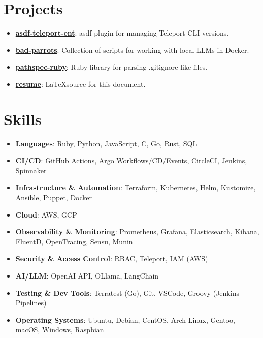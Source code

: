 \documentclass[letterpaper,11pt]{article}
\newcommand{\resumeItem}[2]{
\item[\textgreater]\small{
    \textbf{#1}{: #2 \vspace{-2pt}}
  }
}
\newcommand{\resumeSubItem}[2]{\resumeItem{#1}{#2}\vspace{-4pt}}
\newcommand{\resumeSubHeadingListStart}{\begin{itemize}[leftmargin=*]}
\newcommand{\resumeSubHeadingListEnd}{\end{itemize}}
\begin{document}
\section{Projects}
  \resumeSubHeadingListStart
    \resumeSubItem{\href{https://github.com/highb/asdf-teleport-ent}{asdf-teleport-ent}}
      {asdf plugin for managing Teleport CLI versions.}
    \resumeSubItem{\href{https://github.com/highb/bad-parrots}{bad-parrots}}
      {Collection of scripts for working with local LLMs in Docker.}
    \resumeSubItem{\href{https://github.com/highb/pathspec-ruby}{pathspec-ruby}}
      {Ruby library for parsing .gitignore-like files.}
    \resumeSubItem{\href{https://github.com/highb/resume}{resume}}
      {\LaTeX source for this document.}
  \resumeSubHeadingListEnd

\section{Skills}
  \resumeSubHeadingListStart
    \item{
      \textbf{Languages}{: Ruby, Python, JavaScript, C, Go, Rust, SQL}
    }
    \item{
      \textbf{CI/CD}{: GitHub Actions, Argo Workflows/CD/Events, CircleCI, Jenkins, Spinnaker}
    }
    \item{
      \textbf{Infrastructure \& Automation}{: Terraform, Kubernetes, Helm, Kustomize, Ansible, Puppet, Docker}
    }
    \item{
      \textbf{Cloud}{: AWS, GCP}
    }
    \item{
      \textbf{Observability \& Monitoring}{: Prometheus, Grafana, Elasticsearch, Kibana, FluentD, OpenTracing, Sensu, Munin}
    }
    \item{
      \textbf{Security \& Access Control}{: RBAC, Teleport, IAM (AWS)}
    }
    \item{
      \textbf{AI/LLM}{: OpenAI API, OLlama, LangChain}
    }
    \item{
      \textbf{Testing \& Dev Tools}{: Terratest (Go), Git, VSCode, Groovy (Jenkins Pipelines)}
    }
    \item{
      \textbf{Operating Systems}{: Ubuntu, Debian, CentOS, Arch Linux, Gentoo, macOS, Windows, Raspbian}
    }
  \resumeSubHeadingListEnd



\end{document}

